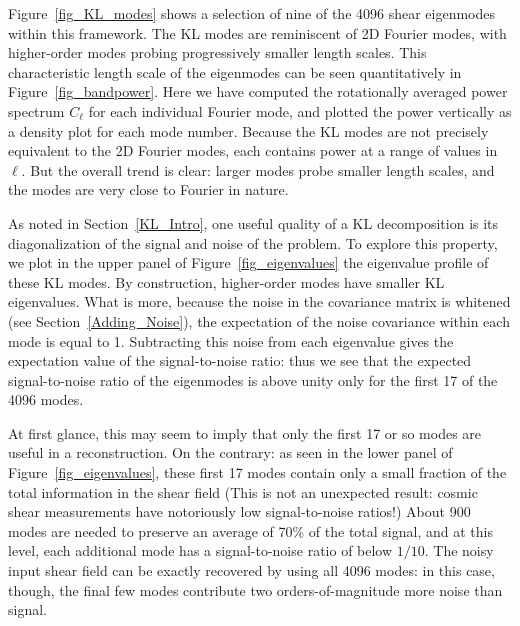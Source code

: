 \documentclass[twocolumn]{emulateapj}
\begin{document}
Figure~\ref{fig_KL_modes} shows a selection of
nine of the 4096 shear eigenmodes within
this framework.  The KL modes are reminiscent of 2D Fourier modes, with
higher-order modes probing progressively smaller length scales.  
This characteristic length scale of the eigenmodes
can be seen quantitatively in Figure~\ref{fig_bandpower}.  
Here we have computed the rotationally averaged
power spectrum $C_\ell$ for each individual Fourier mode, and plotted the
power vertically as a density plot for each mode number.  
Because the KL modes are
not precisely equivalent to the 2D Fourier modes, each contains power at
a range of values in $\ell$.  But the overall trend is clear: larger modes
probe smaller length scales, and the modes are very close to Fourier in
nature.

\begin{figure*}
 \centering
 \caption{The normalized power spectrum of each KL mode.  For constant
   mode number, the figure represents a histogram of the power in that KL
   mode, normalized to a constant total power.  KL modes represent a 
   linear combination of Fourier modes, so that the power in each KL 
   mode is spread over a range of $\ell$ values.  Nevertheless,
   the general trend is clear: larger mode numbers are associated with
   larger wave numbers, and thus smaller length scales.
   \label{fig_bandpower} }
\end{figure*}

As noted in Section~\ref{KL_Intro}, one useful quality of a KL decomposition
is its diagonalization of the signal and noise of the problem.
To explore this property, we plot in the upper panel of 
Figure~\ref{fig_eigenvalues} the eigenvalue profile 
of these KL modes. By construction, higher-order modes 
have smaller KL eigenvalues.  What is more,
because the noise in the covariance matrix is whitened 
(see Section~\ref{Adding_Noise}), the expectation of the noise covariance
within each mode is equal to 1.  Subtracting this noise from each eigenvalue 
gives the expectation value of the signal-to-noise ratio: 
thus we see that the expected
signal-to-noise ratio of the eigenmodes is above unity only for the first
17 of the 4096 modes.

At first glance, this may seem to imply that only the first 17 or so modes
are useful in a reconstruction.  On the contrary: as seen in the lower panel
of Figure~\ref{fig_eigenvalues}, these first 17 modes contain only a
small fraction of the total information in the shear field (This is not 
an unexpected result: cosmic shear measurements have 
notoriously low signal-to-noise ratios!)
About 900 modes are needed to preserve an average of 70\% of the total signal, 
and at this level, each additional mode has a signal-to-noise ratio 
of below $1/10$.  The noisy input shear field can be exactly recovered
by using all 4096 modes: in this case, though, the final few modes 
contribute two orders-of-magnitude more noise than signal.
\end{document}
